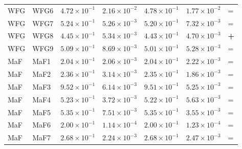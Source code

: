 \begin{table}[t]
\begin{tabular}{llrrrrl}
WFG & WFG6 & $4.72\!\times\!10^{-1}$ & $2.16\!\times\!10^{-2}$ & $4.78\!\times\!10^{-1}$ & $1.77\!\times\!10^{-2}$ & = \\
WFG & WFG7 & $5.24\!\times\!10^{-1}$ & $5.26\!\times\!10^{-3}$ & $5.20\!\times\!10^{-1}$ & $7.32\!\times\!10^{-3}$ & = \\
WFG & WFG8 & $4.45\!\times\!10^{-1}$ & $5.34\!\times\!10^{-3}$ & $4.43\!\times\!10^{-1}$ & $4.70\!\times\!10^{-3}$ & \textbf{+} \\
WFG & WFG9 & $5.09\!\times\!10^{-1}$ & $8.69\!\times\!10^{-3}$ & $5.01\!\times\!10^{-1}$ & $5.28\!\times\!10^{-3}$ & = \\
\addlinespace
MaF & MaF1 & $2.04\!\times\!10^{-1}$ & $2.06\!\times\!10^{-3}$ & $2.04\!\times\!10^{-1}$ & $2.22\!\times\!10^{-3}$ & = \\
MaF & MaF2 & $2.36\!\times\!10^{-1}$ & $3.14\!\times\!10^{-3}$ & $2.35\!\times\!10^{-1}$ & $1.86\!\times\!10^{-3}$ & = \\
MaF & MaF3 & $9.52\!\times\!10^{-1}$ & $6.14\!\times\!10^{-3}$ & $9.51\!\times\!10^{-1}$ & $5.25\!\times\!10^{-3}$ & = \\
MaF & MaF4 & $5.23\!\times\!10^{-1}$ & $3.72\!\times\!10^{-3}$ & $5.22\!\times\!10^{-1}$ & $5.63\!\times\!10^{-3}$ & = \\
MaF & MaF5 & $5.35\!\times\!10^{-1}$ & $7.51\!\times\!10^{-3}$ & $5.35\!\times\!10^{-1}$ & $3.55\!\times\!10^{-3}$ & = \\
MaF & MaF6 & $2.00\!\times\!10^{-1}$ & $1.14\!\times\!10^{-4}$ & $2.00\!\times\!10^{-1}$ & $1.23\!\times\!10^{-4}$ & = \\
MaF & MaF7 & $2.68\!\times\!10^{-1}$ & $2.24\!\times\!10^{-3}$ & $2.68\!\times\!10^{-1}$ & $2.47\!\times\!10^{-3}$ & = \\
\bottomrule
\end{tabular}
\end{table}
